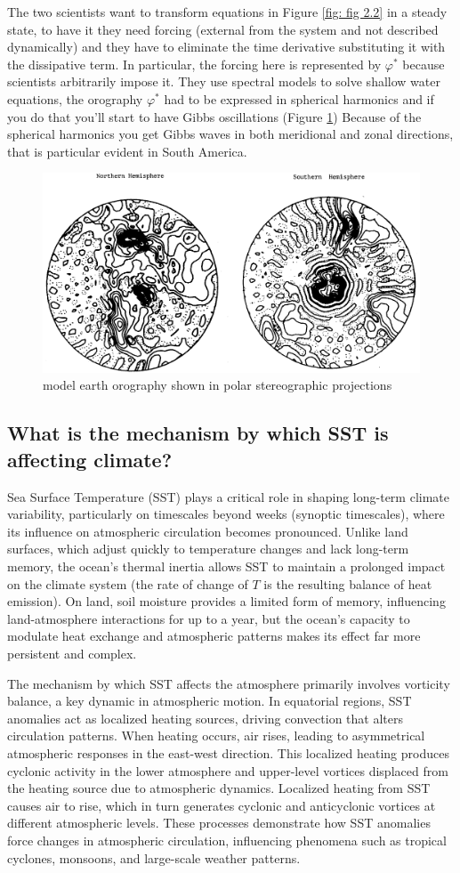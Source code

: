 The two scientists want to transform equations in Figure \ref{fig: fig 2.2}  in a steady state, to have it they need forcing (external from the system and not described dynamically) and they have to eliminate the time derivative substituting it with the dissipative term.
In particular, the forcing here is represented by $\varphi^*$ because scientists arbitrarily impose it.
They use spectral models to solve shallow water equations, the orography $\varphi^*$ had to be expressed in spherical harmonics and if you do that you'll start to have Gibbs oscillations (Figure \ref{fig:fig 2.5})
Because of the spherical harmonics you get Gibbs waves in both meridional and zonal directions, that is particular evident in South America.
\begin{figure}[h!]
	\centering
	\includegraphics[width=0.5\linewidth]{uploads/26image.png}
	\caption{model earth orography shown in polar stereographic projections}
	\label{fig:fig 2.5}
\end{figure}


\subsection{What is the mechanism by which SST is affecting climate?}

Sea Surface Temperature (SST) plays a critical role in shaping long-term climate variability, particularly on timescales beyond weeks (synoptic timescales), where its influence on atmospheric circulation becomes pronounced. Unlike land surfaces, which adjust quickly to temperature changes and lack long-term memory, the ocean's thermal inertia allows SST to maintain a prolonged impact on the climate system (the rate of change of $T$ is the resulting balance of heat emission). On land, soil moisture provides a limited form of memory, influencing land-atmosphere interactions for up to a year, but the ocean’s capacity to modulate heat exchange and atmospheric patterns makes its effect far more persistent and complex.

The mechanism by which SST affects the atmosphere primarily involves vorticity balance, a key dynamic in atmospheric motion. In equatorial regions, SST anomalies act as localized heating sources, driving convection that alters circulation patterns. When heating occurs, air rises, leading to asymmetrical atmospheric responses in the east-west direction. This localized heating produces cyclonic activity in the lower atmosphere and upper-level vortices displaced from the heating source due to atmospheric dynamics. Localized heating from SST causes air to rise, which in turn generates cyclonic and anticyclonic vortices at different atmospheric levels.  These processes demonstrate how SST anomalies force changes in atmospheric circulation, influencing phenomena such as tropical cyclones, monsoons, and large-scale weather patterns.


